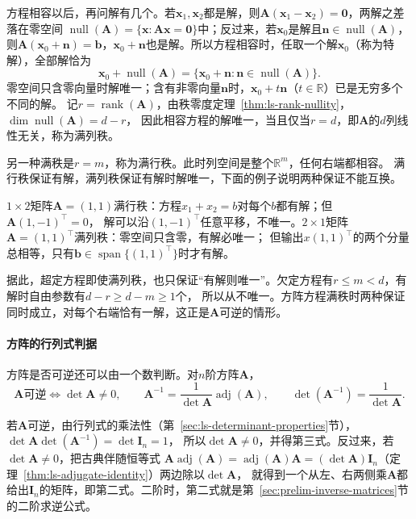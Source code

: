 方程相容以后，再问解有几个。若$\bm x_1,\bm x_2$都是解，则$\bm A(\bm x_1-\bm x_2)=\bm0$，两解之差落在零空间
$\operatorname{null}(\bm A)=\{\bm x:\bm A\bm x=\bm0\}$中；反过来，若$\bm x_0$是解且$\bm n\in\operatorname{null}(\bm A)$，
则$\bm A(\bm x_0+\bm n)=\bm b$，$\bm x_0+\bm n$也是解。所以方程相容时，任取一个解$\bm x_0$（称为特解），全部解恰为
\begin{equation}
 \bm x_0+\operatorname{null}(\bm A)=\{\bm x_0+\bm n:\bm n\in\operatorname{null}(\bm A)\}.
 \label{eq:ls-affine-solution-set}
\end{equation}
零空间只含零向量时解唯一；含有非零向量$\bm n$时，$\bm x_0+t\bm n$（$t\in\mathbb R$）已是无穷多个不同的解。
记$r=\operatorname{rank}(\bm A)$，由秩零度定理~\ref{thm:ls-rank-nullity}，$\dim\operatorname{null}(\bm A)=d-r$，
因此相容方程的解唯一，当且仅当$r=d$，即$\bm A$的$d$列线性无关，称为满列秩。

另一种满秩是$r=m$，称为满行秩。此时列空间是整个$\mathbb R^m$，任何右端都相容。
满行秩保证有解，满列秩保证有解时解唯一，下面的例子说明两种保证不能互换。

\begin{example}[反例：满行秩与满列秩互不蕴含]
\label{ex:ls-row-column-rank}
$1\times2$矩阵$\bm A=(1,1)$满行秩：方程$x_1+x_2=b$对每个$b$都有解；但$\bm A(1,-1)^\top=0$，
解可以沿$(1,-1)^\top$任意平移，不唯一。$2\times1$矩阵$\bm A=(1,1)^\top$满列秩：零空间只含零，有解必唯一；
但输出$x(1,1)^\top$的两个分量总相等，只有$\bm b\in\operatorname{span}\{(1,1)^\top\}$时才有解。
\end{example}

据此，超定方程即使满列秩，也只保证“有解则唯一”。欠定方程有$r\leq m<d$，有解时自由参数有$d-r\geq d-m\geq1$个，
所以从不唯一。方阵方程满秩时两种保证同时成立，对每个右端恰有一解，这正是$\bm A$可逆的情形。

\paragraph{方阵的行列式判据}
\label{sec:ls-determinant-invertibility}
方阵是否可逆还可以由一个数判断。对$n$阶方阵$\bm A$，
\[
 \bm A\text{可逆}\iff\det\bm A\neq0,\qquad
 \bm A^{-1}=\frac{1}{\det\bm A}\operatorname{adj}(\bm A),\qquad
 \det(\bm A^{-1})=\frac{1}{\det\bm A}.
\]

若$\bm A$可逆，由行列式的乘法性（第~\ref{sec:ls-determinant-properties}节），$\det\bm A\det(\bm A^{-1})=\det\bm I_n=1$，
所以$\det\bm A\neq0$，并得第三式。反过来，若$\det\bm A\neq0$，把古典伴随恒等式
$\bm A\operatorname{adj}(\bm A)=\operatorname{adj}(\bm A)\bm A=(\det\bm A)\bm I_n$（定理~\ref{thm:ls-adjugate-identity}）两边除以$\det\bm A$，
就得到一个从左、右两侧乘$\bm A$都给出$\bm I_n$的矩阵，即第二式。二阶时，第二式就是第~\ref{sec:prelim-inverse-matrices}节的二阶求逆公式。

